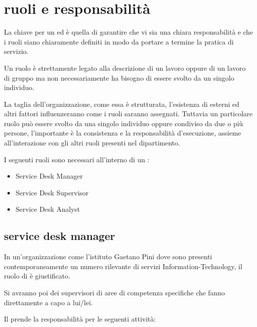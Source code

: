 %
%
\section[Ruoli e responsabilità]{ruoli e responsabilità}
\label{sd-roles-responsabilities}
La chiave per un   ed  è quella di garantire che vi sia una chiara responsabilità e che i ruoli siano chiaramente definiti in modo da portare a termine la pratica di servizio. 

Un ruolo è strettamente legato alla descrizione di un lavoro oppure di un lavoro di gruppo ma non necessariamente ha bisogno di essere svolto da un singolo individuo.

La taglia dell'organizzazione, come essa è strutturata, l'esistenza di  esterni ed altri fattori influenzeranno come i ruoli saranno assegnati. Tuttavia un particolare ruolo può essere svolto da una singolo individuo oppure condiviso da due o più persone, l'importante è la consistenza e la responsabilità d'esecuzione, assieme all'interazione con gli altri ruoli presenti nel dipartimento.

I seguenti ruoli sono necessari all'interno di un :

\begin{itemize}
\item{Service Desk Manager}
\item{Service Desk Supervisor}
\item{Service Desk Analyst}
\end{itemize}

\subsection[Service Desk Manager]{service desk manager}
\label{sd-sd-manger}
In un'organizzazione come l'istituto Gaetano Pini dove sono presenti contemporaneamente un numero rilevante di servizi \acs{Information-Technology}, il ruolo di  è giustificato.

Si avranno poi dei supervisori di aree di competenza specifiche che fanno direttamente a capo a lui/lei.

Il  prende la responsabilità per le seguenti attività:

